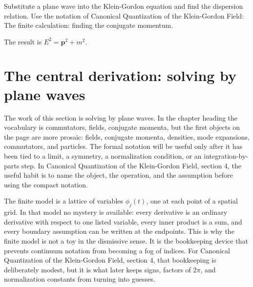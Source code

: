 \begin{exercise}
Substitute a plane wave into the Klein-Gordon equation and find the dispersion relation.  Use the notation of Canonical Quantization of the Klein-Gordon Field: The finite calculation: finding the conjugate momentum.
\begin{answer}
The result is \(E^2=\bm p^2+m^2\).
\end{answer}
\end{exercise}



\section{The central derivation: solving by plane waves}













The work of this section is solving by plane waves.  In the chapter heading the vocabulary is commutators, fields, conjugate momenta, but the first objects on the page are more prosaic: fields, conjugate momenta, densities, mode expansions, commutators, and particles.  The formal notation will be useful only after it has been tied to a limit, a symmetry, a normalization condition, or an integration-by-parts step.  In Canonical Quantization of the Klein-Gordon Field, section 4, the useful habit is to name the object, the operation, and the assumption before using the compact notation.

The finite model is a lattice of variables \(\phi_j(t)\), one at each point of a spatial grid.  In that model no mystery is available: every derivative is an ordinary derivative with respect to one listed variable, every inner product is a sum, and every boundary assumption can be written at the endpoints.  This is why the finite model is not a toy in the dismissive sense.  It is the bookkeeping device that prevents continuum notation from becoming a fog of indices.  For Canonical Quantization of the Klein-Gordon Field, section 4, that bookkeeping is deliberately modest, but it is what later keeps signs, factors of \(2\pi\), and normalization constants from turning into guesses.

